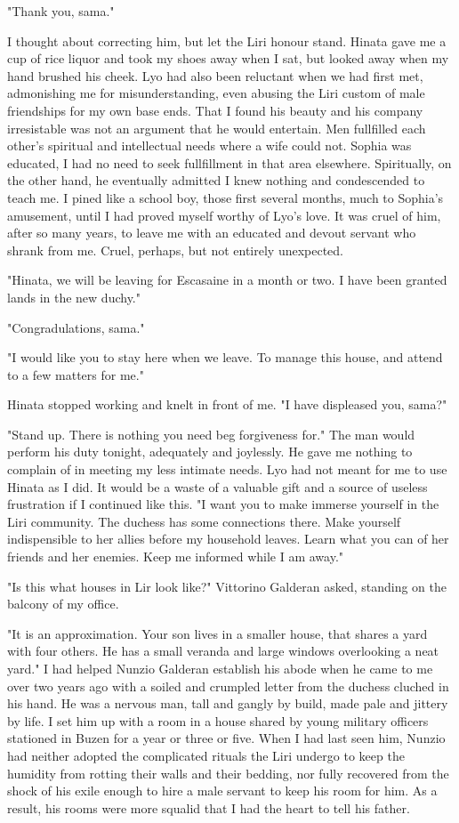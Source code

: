 \documentclass{article}
\begin{document}
"Thank you, sama." 

I thought about correcting him, but let the Liri honour stand. Hinata gave me a cup of rice liquor and took my shoes away when I sat, but looked away when my hand brushed his cheek. Lyo had also been reluctant when we had first met, admonishing me for misunderstanding, even abusing the Liri custom of male friendships for my own base ends. That I found his beauty and his company irresistable was not an argument that he would entertain. Men fullfilled each other's spiritual and intellectual needs where a wife could not. Sophia was educated, I had no need to seek fullfillment in that area elsewhere. Spiritually, on the other hand, he eventually admitted I knew nothing and condescended to teach me. I pined like a school boy, those first several months, much to Sophia's amusement, until I had proved myself worthy of Lyo's love. It was cruel of him, after so many years, to leave me with an educated and devout servant who shrank from me. Cruel, perhaps, but not entirely unexpected. 

"Hinata, we will be leaving for Escasaine in a month or two. I have been granted lands in the new duchy."

"Congradulations, sama."

"I would like you to stay here when we leave. To manage this house, and attend to a few matters for me."

Hinata stopped working and knelt in front of me. "I have displeased you, sama?"

"Stand up. There is nothing you need beg forgiveness for." The man would perform his duty tonight, adequately and joylessly. He gave me nothing to complain of in meeting my less intimate needs. Lyo had not meant for me to use Hinata as I did. It would be a waste of a valuable gift and a source of useless frustration if I continued like this. "I want you to make immerse yourself in the Liri community. The duchess has some connections there. Make yourself indispensible to her allies before my household leaves. Learn what you can of her friends and her enemies. Keep me informed while I am away."

\vspace{.5cm}

"Is this what houses in Lir look like?" Vittorino Galderan asked, standing on the balcony of my office.

"It is an approximation. Your son lives in a smaller house, that shares a yard with four others. He has a small veranda and large windows overlooking a neat yard." I had helped Nunzio Galderan establish his abode when he came to me over two years ago with a soiled and crumpled letter from the duchess cluched in his hand. He was a nervous man, tall and gangly by build, made pale and jittery by life. I set him up with a room in a house shared by young military officers stationed in Buzen for a year or three or five. When I had last seen him, Nunzio had neither adopted the complicated rituals the Liri undergo to keep the humidity from rotting their walls and their bedding, nor fully recovered from the shock of his exile enough to hire a male servant to keep his room for him. As a result, his rooms were more squalid that I had the heart to tell his father.
\end{document}
